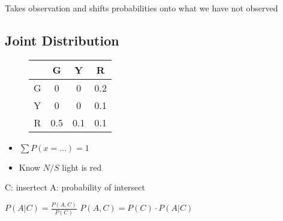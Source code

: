       Takes observation and shifts probabilities onto what we have not observed

    \subsection{Joint Distribution}

      \begin{figure}[H]
        \centering
        \begin{tabular}{|c|c|c|c|}
          \hline
          & G & Y & R \\ \hline
          G & 0 & 0 & 0.2 \\ \hline
          Y & 0 & 0 & 0.1 \\ \hline
          R & 0.5 & 0.1 & 0.1 \\ \hline
        \end{tabular}
      \end{figure}

      \begin{itemize}
        \item $ \sum P (x = ...) = 1 $
        \item Know $ N/S $ light is red
      \end{itemize}

      C: insertect
      A: probability of intersect

      $ P(A|C) = \frac{P(A, C)}{P(C)} $
      $ P(A,C) = P(C) \cdot P(A|C) $
